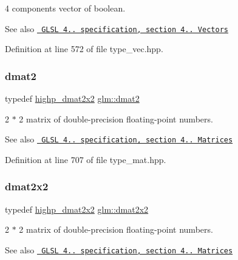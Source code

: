 4 components vector of boolean.

\begin{DoxySeeAlso}{See also}
\href{http://www.opengl.org/registry/doc/GLSLangSpec.4.20.8.pdf}{\texttt{ G\+L\+SL 4.. specification, section 4.. Vectors}} 
\end{DoxySeeAlso}


Definition at line 572 of file type\+\_\+vec.\+hpp.

\mbox{\label{group__core__types_gad8c130d26c4cd9a1a831c1a74292a8f6}} 
\subsubsection{\texorpdfstring{dmat2}{dmat2}}
{\footnotesize\ttfamily typedef \mbox{\hyperlink{group__core__precision_gaf0445ee32625d26bf79bb84e3d5a5502}{highp\+\_\+dmat2x2}} \mbox{\hyperlink{group__core__types_gad8c130d26c4cd9a1a831c1a74292a8f6}{glm\+::dmat2}}}

2 $\ast$ 2 matrix of double-\/precision floating-\/point numbers.

\begin{DoxySeeAlso}{See also}
\href{http://www.opengl.org/registry/doc/GLSLangSpec.4.20.8.pdf}{\texttt{ G\+L\+SL 4.. specification, section 4.. Matrices}} 
\end{DoxySeeAlso}


Definition at line 707 of file type\+\_\+mat.\+hpp.

\mbox{\label{group__core__types_gae9932771e11a4f38e21f1136423bab18}} 
\subsubsection{\texorpdfstring{dmat2x2}{dmat2x2}}
{\footnotesize\ttfamily typedef \mbox{\hyperlink{group__core__precision_gaf0445ee32625d26bf79bb84e3d5a5502}{highp\+\_\+dmat2x2}} \mbox{\hyperlink{group__core__types_gae9932771e11a4f38e21f1136423bab18}{glm\+::dmat2x2}}}

2 $\ast$ 2 matrix of double-\/precision floating-\/point numbers.

\begin{DoxySeeAlso}{See also}
\href{http://www.opengl.org/registry/doc/GLSLangSpec.4.20.8.pdf}{\texttt{ G\+L\+SL 4.. specification, section 4.. Matrices}} 
\end{DoxySeeAlso}


